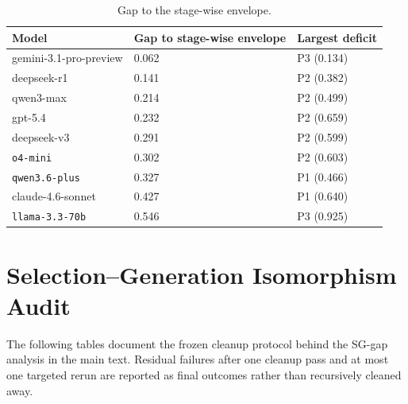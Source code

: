 \begin{table}[t]
\caption{Gap to the stage-wise envelope.}
\label{tab:appendix_stage_gap}
\centering
\scriptsize
\setlength{\tabcolsep}{5pt}
\renewcommand{\arraystretch}{1.08}
\begin{tabular}{p{38mm}p{34mm}p{44mm}}
\toprule
Model & Gap to stage-wise envelope & Largest deficit \\
\midrule
gemini-3.1-pro-preview & 0.062 & P3 (0.134) \\
deepseek-r1 & 0.141 & P2 (0.382) \\
qwen3-max & 0.214 & P2 (0.499) \\
gpt-5.4 & 0.232 & P2 (0.659) \\
deepseek-v3 & 0.291 & P2 (0.599) \\
\texttt{o4-mini} & 0.302 & P2 (0.603) \\
\texttt{qwen3.6-plus} & 0.327 & P1 (0.466) \\
claude-4.6-sonnet & 0.427 & P1 (0.640) \\
\texttt{llama-3.3-70b} & 0.546 & P3 (0.925) \\
\bottomrule
\end{tabular}
\end{table}

\clearpage


\clearpage


\clearpage


\clearpage


\clearpage
\section{Selection--Generation Isomorphism Audit}
\label{sec:appendix_isomorphic}

The following tables document the frozen cleanup protocol behind the SG-gap analysis in the main text. Residual failures after one cleanup pass and at most one targeted rerun are reported as final outcomes rather than recursively cleaned away.



\clearpage


\clearpage

